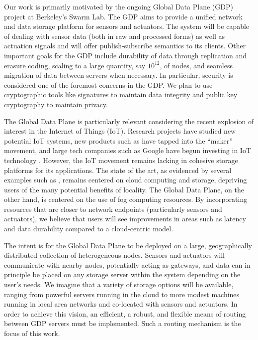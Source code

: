 Our work is primarily motivated by the ongoing Global Data Plane (GDP)\cite{gdp} project at Berkeley's Swarm Lab. The GDP aims to provide a unified network and data storage platform for sensors and actuators. The system will be capable of dealing with sensor data (both in raw and processed forms) as well as actuation signals and will offer publish-subscribe semantics to its clients. Other important goals for the GDP include durability of data through replication and erasure coding, scaling to a large quantity, say $10^{12}$, of nodes, and seamless migration of data between servers when necessary. In particular, security is considered one of the foremost concerns in the GDP. We plan to use cryptographic tools like signatures to maintain data integrity and public key cryptography to maintain privacy.

The Global Data Plane is particularly relevant considering the recent explosion of interest in the Internet of Things (IoT). Research projects \cite{homeOS, bas, boss} have studied new potential IoT systems, new products such as \cite{arduino} have tapped into the ``maker'' movement, and large tech companies such as Google have begun investing in IoT technology \cite{nest}. However, the IoT movement remains lacking in cohesive storage platforms for its applications. The state of the art, as evidenced by several examples such as \cite{ibm}, remains centered on cloud computing and storage, depriving users of the many potential benefits of locality. The Global Data Plane, on the other hand, is centered on the use of fog computing \cite{fog} resources. By incorporating resources that are closer to network endpoints (particularly sensors and actuators), we believe that users will see improvements in areas such as latency and data durability compared to a cloud-centric model.

The intent is for the Global Data Plane to be deployed on a large, geographically distributed collection of heterogeneous nodes. Sensors and actuators will communicate with nearby nodes, potentially acting as gateways, and data can in principle be placed on any storage server within the system depending on the user's needs. We imagine that a variety of storage options will be available, ranging from powerful servers running in the cloud to more modest machines running in local area networks and co-located with sensors and actuators. In order to achieve this vision, an efficient, a robust, and flexible means of routing between GDP servers must be implemented. Such a routing mechanism is the focus of this work.


